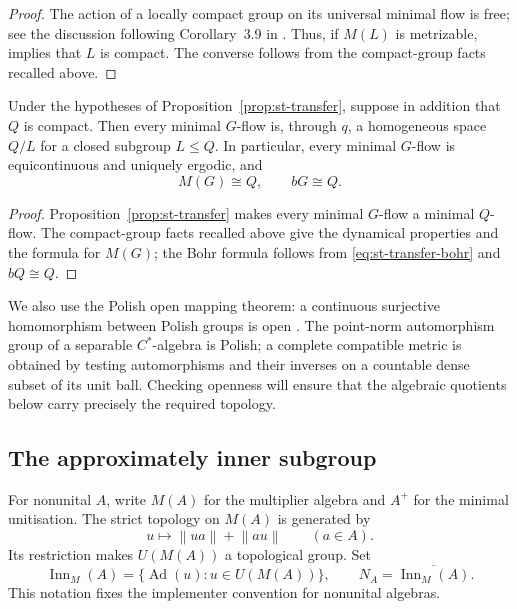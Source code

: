 \begin{proof}
The action of a locally compact group on its universal minimal flow is free;
see the discussion following Corollary~3.9 in \cite{BYMT2017}. Thus, if $M(L)$
is metrizable, \cite[Corollary~3.9]{BYMT2017} implies that $L$ is compact. The
converse follows from the compact-group facts recalled above.
\end{proof}

\begin{corollary}\label{cor:st-compact-quotient-minimal}
 Under the hypotheses of Proposition~\ref{prop:st-transfer}, suppose in addition that $Q$ is compact. Then every minimal 
$G$-flow is, through $q$, a homogeneous space $Q/L$ for a closed subgroup $L\leq Q$. In particular, every minimal $G$-flow is equicontinuous and
uniquely ergodic, and 
\begin{equation*}
M(G)\cong Q,\qquad bG\cong Q. 
\end{equation*}
\end{corollary}

\begin{proof}
Proposition~\ref{prop:st-transfer} makes every minimal $G$-flow a minimal $Q$-flow. The compact-group facts recalled above give the dynamical properties and the
formula for $M(G)$; the Bohr formula follows from \eqref{eq:st-transfer-bohr}
and $bQ\cong Q$.
\end{proof}

We also use the Polish open mapping theorem: a continuous surjective
homomorphism between Polish groups is open \cite{BeckerKechris1996}. The
point-norm automorphism group of a separable $C^*$-algebra is Polish; a
complete compatible metric is obtained by testing automorphisms and their
inverses on a countable dense subset of its unit ball. Checking openness
will ensure that the algebraic quotients below carry precisely the required
topology.


\subsection{The approximately inner subgroup}

\label{sec:st-kernel} For nonunital $A$, write $M(A)$ for the multiplier
algebra and $A^+$ for the minimal unitisation. The strict topology on $M(A)$
is generated by 
\begin{equation*}
u\longmapsto\left\|ua\right\|+\left\|au\right\|\qquad(a\in A). 
\end{equation*}
Its restriction makes $U(M(A))$ a topological group. Set 
\begin{equation*}
\operatorname{Inn}_M(A)=\{\operatorname{Ad}(u):u\in U(M(A))\},\qquad  N_A=\overline{\operatorname{Inn}_M(A)}. 
\end{equation*}
This notation fixes the implementer convention for nonunital algebras.

